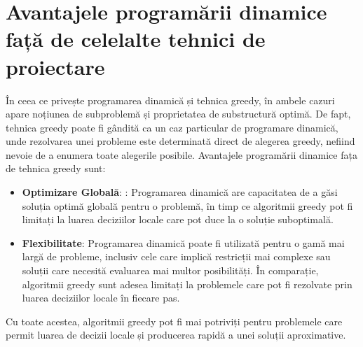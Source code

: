 \section{Avantajele programării dinamice față de celelalte tehnici de proiectare}
În ceea ce privește programarea dinamică și tehnica greedy, 
în ambele cazuri apare noțiunea de subproblemă și proprietatea de substructură optimă. De fapt, tehnica greedy poate fi gândită ca un caz particular de programare dinamică, unde rezolvarea unei probleme este determinată direct de alegerea greedy, nefiind nevoie de a
enumera toate alegerile posibile. Avantajele programării dinamice fața de tehnica greedy sunt:
\begin{itemize}
  \item \textbf {Optimizare Globală}: : Programarea dinamică are capacitatea de a găsi soluția optimă globală pentru o problemă, în timp ce algoritmii greedy pot fi limitați la luarea deciziilor locale care pot duce la o soluție suboptimală.
  \item \textbf {Flexibilitate}: Programarea dinamică poate fi utilizată pentru o gamă mai largă de probleme, inclusiv cele care implică restricții mai complexe sau soluții care necesită evaluarea mai multor posibilități. În comparație, algoritmii greedy sunt adesea limitați la problemele care pot fi rezolvate prin luarea deciziilor locale în fiecare pas.
  
\end{itemize}
Cu toate acestea, algoritmii greedy pot fi mai potriviți pentru problemele care permit luarea de decizii locale și producerea rapidă a unei soluții aproximative.